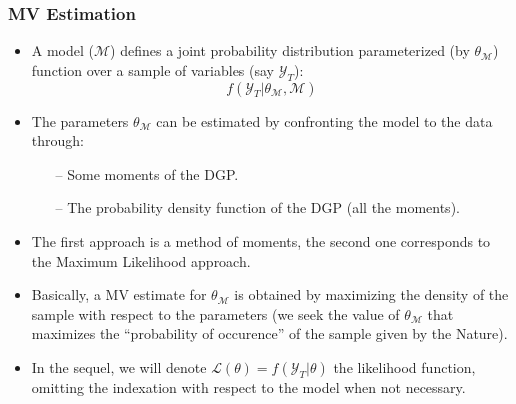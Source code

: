 \documentclass[10pt,slidestop]{beamer}
\newcommand{\AllSample}{ \mathcal Y_T }
\begin{document}
\begin{frame}
  \frametitle{MV Estimation}
  \begin{itemize}
    \item A model ($\mathcal M$) defines a joint probability distribution parameterized
      (by $\theta_{\mathcal M}$) function over a sample of variables (say $\AllSample$):
      \begin{equation}\label{equ:bayes:model}
        f(\AllSample | \theta_{\mathcal M} , \mathcal M)
      \end{equation}
    \item The parameters $\theta_{\mathcal M}$ can be estimated by
      confronting the model to the data through:
      \begin{itemize}
      \item[--] Some moments of the DGP.
      \item[--] The probability density function of the DGP (all the moments).
      \end{itemize}
    \item The first approach is a method of moments, the second
      one corresponds to the Maximum Likelihood approach.
    \item Basically, a MV estimate for $\theta_{\mathcal M}$ is
      obtained by maximizing the density of the sample with respect to
      the parameters (we seek the value of $\theta_{\mathcal M}$ that
      maximizes the ``probability of occurence'' of the sample given
      by the Nature).
    \item In the sequel, we will denote $\mathcal L(\theta) = f(\AllSample | \theta )$ the
      likelihood function, omitting the indexation with respect to the
      model when not necessary.
  \end{itemize}
\end{frame}
\end{document}
